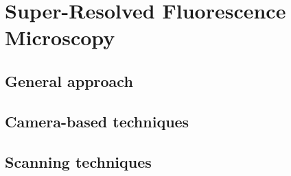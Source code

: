 \section{Super-Resolved Fluorescence Microscopy}
\label{sec:srfm}
\subsection{General approach}

\subsection{Camera-based techniques}

\subsection{Scanning techniques}
